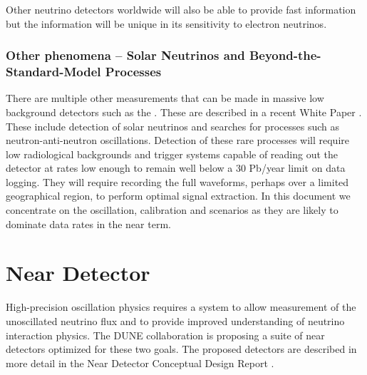 \documentclass[../main-v1.tex]{subfiles}
\begin{document}
Other neutrino detectors worldwide will also be able to provide fast information but the  information will be unique in its sensitivity to electron neutrinos. 


\subsubsection{Other phenomena -- Solar Neutrinos and Beyond-the-Standard-Model Processes} %
There are multiple other measurements that can be made in  massive low background detectors such as the .  These are described in a recent White Paper \cite{Caratelli:2022llt}. These include detection of solar neutrinos and searches for  processes such as neutron-anti-neutron oscillations.  Detection of these rare processes will require low radiological backgrounds and trigger systems capable of reading out the detector at rates low enough to remain well below a 30 Pb/year limit on data logging.  They will require recording the full waveforms, perhaps over a limited geographical region, to perform optimal signal extraction. In this document we concentrate on the oscillation, calibration and  scenarios as they are likely to dominate data rates in the near term.  




\section{Near Detector }

High-precision oscillation physics requires a  system to allow measurement of the unoscillated neutrino flux and %
to provide improved understanding of neutrino interaction physics. 
The DUNE  collaboration is proposing a suite of near detectors optimized for these two goals. The proposed detectors are described in more detail in the Near Detector Conceptual Design Report \cite{DUNE:2021tad}.
 
\end{document}

